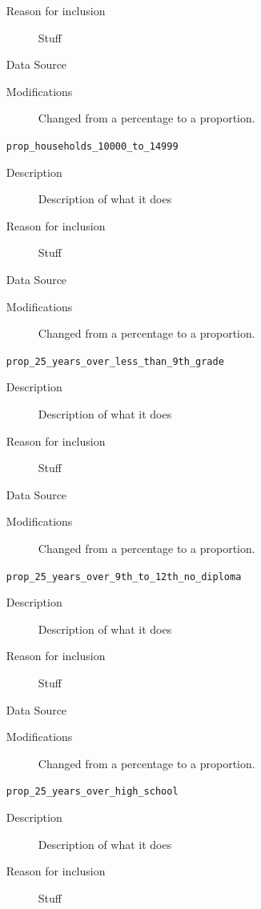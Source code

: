 \documentclass{article}
\begin{document}
\begin{itemize}[label={}, align=left]
\begin{description}
              \item[Reason for inclusion] Stuff
              \item[Data Source] \cite{acs_income_data}
              \item[Modifications] Changed from a percentage to a proportion.
          \end{description}
    \item[\texttt{prop\_households\_10000\_to\_14999}] \
          \begin{description}
              \item[Description] Description of what it does
              \item[Reason for inclusion] Stuff
              \item[Data Source] \cite{acs_income_data}
              \item[Modifications] Changed from a percentage to a proportion.
          \end{description}
    \item[\texttt{prop\_25\_years\_over\_less\_than\_9th\_grade}] \
          \begin{description}
              \item[Description] Description of what it does
              \item[Reason for inclusion] Stuff
              \item[Data Source] \cite{acs_education_data}
              \item[Modifications] Changed from a percentage to a proportion.
          \end{description}
    \item[\texttt{prop\_25\_years\_over\_9th\_to\_12th\_no\_diploma}] \
          \begin{description}
              \item[Description] Description of what it does
              \item[Reason for inclusion] Stuff
              \item[Data Source] \cite{acs_education_data}
              \item[Modifications] Changed from a percentage to a proportion.
          \end{description}
    \item[\texttt{prop\_25\_years\_over\_high\_school}] \
          \begin{description}
              \item[Description] Description of what it does
              \item[Reason for inclusion] Stuff

\end{description}
\end{itemize}
\end{document}

